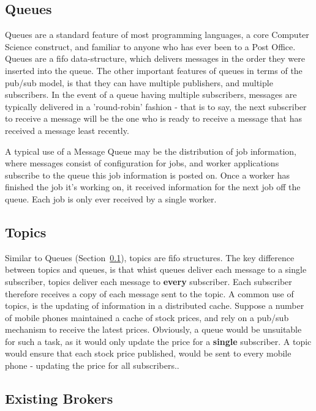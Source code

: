 \subsection{Queues}
\label{sub:queues}

Queues are a standard feature of most programming languages, a core Computer
Science construct, and familiar to anyone who has ever been to a Post Office.
Queues are a \gls{fifo} data-structure, which delivers messages in the order
they were inserted into the queue. The other important features of queues in
terms of the pub/sub model, is that they can have multiple publishers, and
multiple subscribers. In the event of a queue having multiple subscribers,
messages are typically delivered in a 'round-robin' fashion - that is to say,
the next subscriber to receive a message will be the one who is ready to receive
a message that has received a message least recently.

A typical use of a Message
Queue may be the distribution of job information, where messages consist of
configuration for jobs, and worker applications subscribe to the queue this job
information is posted on. Once a worker has finished the job it's working on, it
received information for the next job off the queue. Each job is only ever
received by a single worker.

\subsection{Topics}
\label{sub:topics}

Similar to Queues (Section~\ref{sub:queues}), topics are \gls{fifo} structures.
The key difference between topics and queues, is that whist queues deliver each
message to a single subscriber, topics deliver each message to \textbf{every}
subscriber. Each subscriber therefore receives a copy of each message sent to
the topic. A common use of topics, is the updating of information in a
distributed cache. Suppose a number of mobile phones maintained a cache of stock
prices, and rely on a pub/sub mechanism to receive the latest prices. Obviously,
a queue would be unsuitable for such a task, as it would only update the price
for a \textbf{single} subscriber. A topic would ensure that each stock price
published, would be sent to every mobile phone - updating the price for all
subscribers..

\subsection{Existing Brokers}
\label{sub:Existing Brokers}

